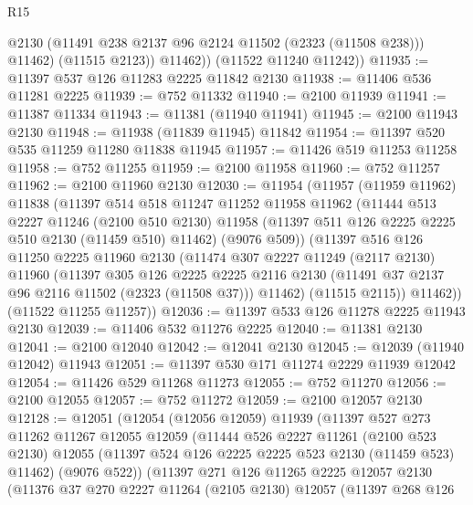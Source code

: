 \begin{lexlean}{R15}
\begin{coremodule}
              @2130
              (@11491 @238 @2137 @96 @2124 @11502 (@2323 (@11508 @238)))
              @11462)
            (@11515 @2123))
          @11462))
      (@11522 @11240 @11242))
@11935 := @11397 @537 @126 @11283 @2225 @11842 @2130
@11938 := @11406 @536 @11281 @2225
@11939 := @752 @11332
@11940 := @2100 @11939
@11941 := @11387 @11334
@11943 := @11381 (@11940 @11941)
@11945 := @2100 @11943 @2130
@11948 := @11938 (@11839 @11945) @11842
@11954 := @11397 @520 @535 @11259 @11280 @11838 @11945
@11957 := @11426 @519 @11253 @11258
@11958 := @752 @11255
@11959 := @2100 @11958
@11960 := @752 @11257
@11962 := @2100 @11960 @2130
@12030 := @11954
    (@11957
      (@11959 @11962)
      @11838
      (@11397
        @514
        @518
        @11247
        @11252
        @11958
        @11962
        (@11444
          @513
          @2227
          @11246
          (@2100 @510 @2130)
          @11958
          (@11397 @511 @126 @2225 @2225 @510 @2130 (@11459 @510) @11462)
          (@9076 @509))
        (@11397
          @516
          @126
          @11250
          @2225
          @11960
          @2130
          (@11474
            @307
            @2227
            @11249
            (@2117 @2130)
            @11960
            (@11397
              @305
              @126
              @2225
              @2225
              @2116
              @2130
              (@11491 @37 @2137 @96 @2116 @11502 (@2323 (@11508 @37)))
              @11462)
            (@11515 @2115))
          @11462))
      (@11522 @11255 @11257))
@12036 := @11397 @533 @126 @11278 @2225 @11943 @2130
@12039 := @11406 @532 @11276 @2225
@12040 := @11381 @2130
@12041 := @2100 @12040
@12042 := @12041 @2130
@12045 := @12039 (@11940 @12042) @11943
@12051 := @11397 @530 @171 @11274 @2229 @11939 @12042
@12054 := @11426 @529 @11268 @11273
@12055 := @752 @11270
@12056 := @2100 @12055
@12057 := @752 @11272
@12059 := @2100 @12057 @2130
@12128 := @12051
    (@12054
      (@12056 @12059)
      @11939
      (@11397
        @527
        @273
        @11262
        @11267
        @12055
        @12059
        (@11444
          @526
          @2227
          @11261
          (@2100 @523 @2130)
          @12055
          (@11397 @524 @126 @2225 @2225 @523 @2130 (@11459 @523) @11462)
          (@9076 @522))
        (@11397
          @271
          @126
          @11265
          @2225
          @12057
          @2130
          (@11376
            @37
            @270
            @2227
            @11264
            (@2105 @2130)
            @12057
            (@11397
              @268
              @126

\end{coremodule}
\end{lexlean}
